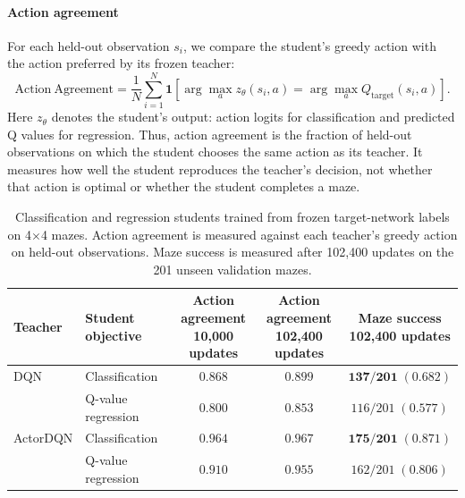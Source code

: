 \documentclass[a4paper,12pt]{article}
\begin{document}
\paragraph{Action agreement}
For each held-out observation $s_i$, we compare the student's greedy action with the action preferred by its frozen teacher:
\begin{equation}
    \mathrm{Action\ Agreement}
    = \frac{1}{N}\sum_{i=1}^{N}
    \mathbf{1}\!\left[
        \arg\max_a z_{\theta}(s_i,a)
        =
        \arg\max_a Q_{\mathrm{target}}(s_i,a)
    \right].
\end{equation}
Here $z_{\theta}$ denotes the student's output: action logits for classification and predicted Q values for regression. Thus, action agreement is the fraction of held-out observations on which the student chooses the same action as its teacher. It measures how well the student reproduces the teacher's decision, not whether that action is optimal or whether the student completes a maze.

\begin{table}[htbp]
    \centering
    \small
    \caption{Classification and regression students trained from frozen target-network labels on 4$\times$4 mazes. Action agreement is measured against each teacher's greedy action on held-out observations. Maze success is measured after 102,400 updates on the 201 unseen validation mazes.}
    \begin{tabular}{llccc}
        \hline
        Teacher & Student objective & \shortstack{Action agreement\\10,000 updates} & \shortstack{Action agreement\\102,400 updates} & \shortstack{Maze success\\102,400 updates} \\
        \hline
        DQN & Classification & $\mathbf{0.868}$ & $\mathbf{0.899}$ & $\mathbf{137/201\;(0.682)}$ \\
            & Q-value regression & $0.800$ & $0.853$ & $116/201\;(0.577)$ \\
        \hline
        ActorDQN & Classification & $\mathbf{0.964}$ & $\mathbf{0.967}$ & $\mathbf{175/201\;(0.871)}$ \\
                 & Q-value regression & $0.910$ & $0.955$ & $162/201\;(0.806)$ \\
        \hline
    \end{tabular}
    \label{tab:classification_regression_probe}
\end{table}
\end{document}
